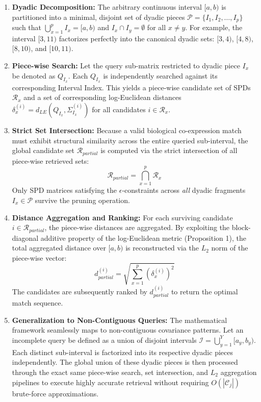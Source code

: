 \documentclass[pdflatex,sn-mathphys-num]{sn-jnl}%
\theoremstyle{thmstyleone}%
\theoremstyle{thmstyletwo}%
\theoremstyle{thmstylethree}%
\begin{document}
\begin{enumerate}
    \item \textbf{Dyadic Decomposition:} The arbitrary continuous interval $[a, b)$ is partitioned into a minimal, disjoint set of dyadic pieces $\mathcal{P} = \{I_1, I_2, \dots, I_p\}$ such that $\bigcup_{x=1}^p I_x = [a, b)$ and $I_x \cap I_y = \emptyset$ for all $x \neq y$. For example, the interval $[3, 11)$ factorizes perfectly into the canonical dyadic sets: $[3, 4)$, $[4, 8)$, $[8, 10)$, and $[10, 11)$.
    
    \item \textbf{Piece-wise Search:} Let the query sub-matrix restricted to dyadic piece $I_x$ be denoted as $Q_{I_x}$. Each $Q_{I_x}$ is independently searched against its corresponding Interval Index. This yields a piece-wise candidate set of SPDs $\mathcal{R}_x$ and a set of corresponding log-Euclidean distances $\delta_x^{(i)} = d_{LE}(Q_{I_x}, \Sigma_{I_x}^{(i)})$ for all candidates $i \in \mathcal{R}_x$.
    
    \item \textbf{Strict Set Intersection:} Because a valid biological co-expression match must exhibit structural similarity across the entire queried sub-interval, the global candidate set $\mathcal{R}_{partial}$ is computed via the strict intersection of all piece-wise retrieved sets:
    $$
    \mathcal{R}_{partial} = \bigcap_{x=1}^p \mathcal{R}_x
    $$
    Only SPD matrices satisfying the $\epsilon$-constraints across \textit{all} dyadic fragments $I_x \in \mathcal{P}$ survive the pruning operation.
    
    \item \textbf{Distance Aggregation and Ranking:} For each surviving candidate $i \in \mathcal{R}_{partial}$, the piece-wise distances are aggregated. By exploiting the block-diagonal additive property of the log-Euclidean metric (Proposition 1), the total aggregated distance over $[a, b)$ is reconstructed via the $L_2$ norm of the piece-wise vector:
    $$
    d_{partial}^{(i)} = \sqrt{\sum_{x=1}^p \left(\delta_x^{(i)}\right)^2}
    $$
    The candidates are subsequently ranked by $d_{partial}^{(i)}$ to return the optimal match sequence.
    
    \item \textbf{Generalization to Non-Contiguous Queries:} The mathematical framework seamlessly maps to non-contiguous covariance patterns. Let an incomplete query be defined as a union of disjoint intervals $\mathcal{I} = \bigcup_{y=1}^Y [a_y, b_y)$. Each distinct sub-interval is factorized into its respective dyadic pieces independently. The global union of these dyadic pieces is then processed through the exact same piece-wise search, set intersection, and $L_2$ aggregation pipelines to execute highly accurate retrieval without requiring $O(|\mathcal{C}_j|)$ brute-force approximations.
\end{enumerate}
\end{document}
